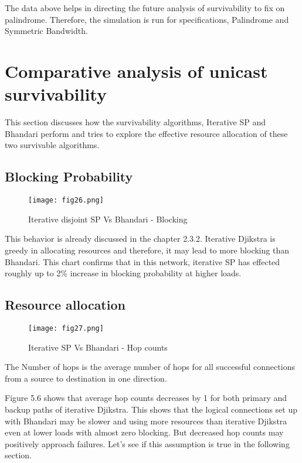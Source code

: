 The data above helps in directing the future analysis of survivability to fix on palindrome. Therefore, the simulation is run for specifications, Palindrome and Symmetric Bandwidth.

\section {Comparative analysis of unicast survivability}

This section discusses how the survivability algorithms, Iterative SP and Bhandari perform and tries to explore the effective resource allocation of these two survivable algorithms.

\subsection {Blocking Probability}


\begin{figure}[H]
\centering
\texttt{[image: fig26.png]}
\caption{Iterative disjoint SP Vs Bhandari - Blocking}
\label{fig:iterVsBhBlock}
\end{figure}

This behavior is already discussed in the chapter 2.3.2. Iterative Djikstra is greedy in allocating resources and therefore, it may lead to more blocking than Bhandari. This chart confirms that in this network, iterative SP has effected roughly up to 2\% increase in blocking probability at higher loads. 

\subsection{Resource allocation}

	
\begin{figure}[H]
\centering
\texttt{[image: fig27.png]}
\caption{Iterative SP Vs Bhandari - Hop counts}
\label{fig:iterVsBhHops}
\end{figure}
	
The Number of hops is the average number of hops for all successful connections from a source to destination in one direction.
	
Figure 5.6 shows that average hop counts decreases by 1 for both primary and backup paths of iterative Djikstra. This shows that the logical connections set up with Bhandari may be slower and using more resources than iterative Djikstra even at lower loads with almost zero blocking. But decreased hop counts may positively approach failures. Let's see if this assumption is true in the following section.

